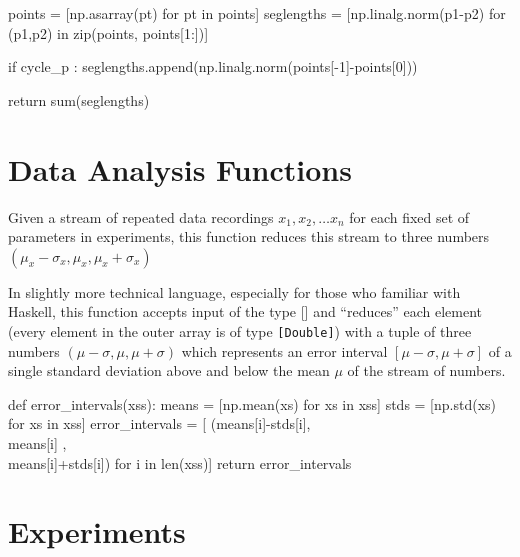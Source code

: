      points     = [np.asarray(pt) for pt in points]
     seglengths = [np.linalg.norm(p1-p2) for (p1,p2) in zip(points, points[1:])]

     if cycle_p :
          seglengths.append(np.linalg.norm(points[-1]-points[0]))

     return sum(seglengths)
\nwendcode{}    



\section{Data Analysis Functions}
Given a stream of repeated data recordings $x_1, x_2, \ldots x_n$ for each fixed set of parameters
in experiments, this function reduces this stream to three numbers $(\mu_x-\sigma_x, \mu_x, \mu_x+\sigma_x)$

In slightly more technical language, especially for those who familiar with Haskell, 
this function accepts input of the type [\!] and ``reduces'' each 
element (every element in the outer array is of type \texttt{[Double]})
with a tuple of three numbers $(\mu-\sigma, \mu, \mu+\sigma)$ which represents an 
error interval $[\mu-\sigma, \mu + \sigma]$ of a single standard deviation above and
below the mean $\mu$ of the stream of numbers. 

\nwenddocs{}\plusendmoddef\nwstartdeflinemarkup{}\nwenddeflinemarkup
def error_intervals(xss):
     means           = [np.mean(xs) for xs in xss]
     stds            = [np.std(xs)  for xs in xss]
     error_intervals =  [ (means[i]-stds[i], \\
                           means[i]        , \\
                           means[i]+stds[i])   for i in len(xss)]
     return error_intervals
\nwendcode{}\nwdocspar


%


\section{Experiments}


